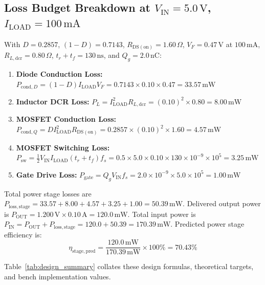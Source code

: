 \documentclass[12pt,a4paper]{article}
\newcommand{\Vin}{V_{\mathrm{IN}}}
\newcommand{\Iload}{I_{\mathrm{LOAD}}}
\newcommand{\Pin}{P_{\mathrm{IN}}}
\newcommand{\Pout}{P_{\mathrm{OUT}}}
\newcommand{\fs}{f_s}
\newcommand{\Rdson}{R_{\mathrm{DS(on)}}}
\newcommand{\DCR}{R_{L,\mathrm{dcr}}}
\begin{document}
\subsection{Loss Budget Breakdown at \texorpdfstring{$\Vin = 5.0\,\mathrm{V}$, $\Iload = 100\,\mathrm{mA}$}{(Vin = 5.0V, Iload = 100mA)}}
With $D = 0.2857$, $(1 - D) = 0.7143$, $\Rdson = 1.60\,\Omega$, $V_F = 0.47\,\mathrm{V}$ at $100\,\mathrm{mA}$, $\DCR = 0.80\,\Omega$, $t_r + t_f = 130\,\mathrm{ns}$, and $Q_g = 2.0\,\mathrm{nC}$:
\begin{enumerate}
    \item \textbf{Diode Conduction Loss:} $P_{\mathrm{cond},D} = (1 - D)\Iload V_F = 0.7143 \times 0.10 \times 0.47 = \mathbf{33.57\,\mathrm{mW}}$
    \item \textbf{Inductor DCR Loss:} $P_L = \Iload^2 \DCR = (0.10)^2 \times 0.80 = \mathbf{8.00\,\mathrm{mW}}$
    \item \textbf{MOSFET Conduction Loss:} $P_{\mathrm{cond},Q} = D \Iload^2 \Rdson = 0.2857 \times (0.10)^2 \times 1.60 = \mathbf{4.57\,\mathrm{mW}}$
    \item \textbf{MOSFET Switching Loss:} $P_{\mathrm{sw}} = \frac{1}{2} \Vin \Iload (t_r + t_f) \fs = 0.5 \times 5.0 \times 0.10 \times 130\times 10^{-9} \times 10^5 = \mathbf{3.25\,\mathrm{mW}}$
    \item \textbf{Gate Drive Loss:} $P_{\mathrm{gate}} = Q_g \Vin \fs = 2.0\times 10^{-9} \times 5.0 \times 10^5 = \mathbf{1.00\,\mathrm{mW}}$
\end{enumerate}
Total power stage losses are $P_{\mathrm{loss,stage}} = 33.57 + 8.00 + 4.57 + 3.25 + 1.00 = \mathbf{50.39\,\mathrm{mW}}$.
Delivered output power is $\Pout = 1.200\,\mathrm{V} \times 0.10\,\mathrm{A} = \mathbf{120.0\,\mathrm{mW}}$.
Total input power is $\Pin = \Pout + P_{\mathrm{loss,stage}} = 120.0 + 50.39 = \mathbf{170.39\,\mathrm{mW}}$.
Predicted power stage efficiency is:
\begin{equation}
    \eta_{\mathrm{stage,pred}} = \frac{120.0\,\mathrm{mW}}{170.39\,\mathrm{mW}} \times 100\% = \mathbf{70.43\%}
\end{equation}

Table~\ref{tab:design_summary} collates these design formulas, theoretical targets, and bench implementation values.
\end{document}
